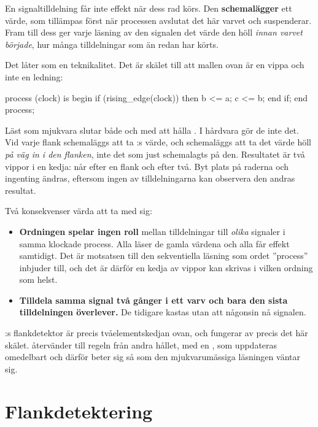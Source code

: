 En signaltilldelning får inte effekt när dess rad körs. Den \textbf{schemalägger} ett värde, som
tillämpas först när processen avslutat det här varvet och suspenderar. Fram till dess ger varje
läsning av den signalen det värde den höll \emph{innan varvet började}, hur många tilldelningar som
än redan har körts.

Det låter som en teknikalitet. Det är skälet till att mallen ovan är en vippa och inte en ledning:

\begin{vhdlcode}
process (clock) is
begin
    if (rising_edge(clock)) then
        b <= a;
        c <= b;
    end if;
end process;
\end{vhdlcode}

Läst som mjukvara slutar både  och  med att hålla . I hårdvara gör de inte
det. Vid varje flank schemaläggs  att ta :s värde, och  schemaläggs att ta
det värde  höll \emph{på väg in i den flanken}, inte det som just schemalagts på den.
Resultatet är två vippor i en kedja:  når  efter en flank och  efter två.
Byt plats på raderna och ingenting ändras, eftersom ingen av tilldelningarna kan observera den
andras resultat.

Två konsekvenser värda att ta med sig:
\begin{itemize}
  \item \textbf{Ordningen spelar ingen roll} mellan tilldelningar till \emph{olika} signaler i
    samma klockade process. Alla läser de gamla värdena och alla får effekt samtidigt. Det är
    motsatsen till den sekventiella läsning som ordet ”process” inbjuder till, och det är därför en
    kedja av vippor kan skrivas i vilken ordning som helst.
  \item \textbf{Tilldela samma signal två gånger i ett varv och bara den sista tilldelningen
    överlever.} De tidigare kastas utan att någonsin nå signalen.
\end{itemize}

:s flankdetektor är precis tvåelementskedjan ovan, och fungerar av precis det
här skälet.  återvänder till regeln från andra hållet, med en , som
uppdateras omedelbart och därför beter sig så som den mjukvarumässiga läsningen väntar sig.

\section{Flankdetektering}
\label{c3:sec:edge}

